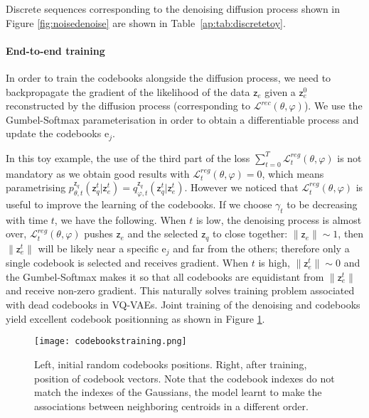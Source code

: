 \documentclass{article}
\theoremstyle{plain}
\theoremstyle{definition}
\theoremstyle{remark}
\newcommand{\latentcont}{\mathsf{z}_e}
\newcommand{\latentdis}{\mathsf{z}_q}
\newcommand{\rme}{\mathrm{e}}
\newcommand{\embed}{\rme}
\begin{document}
Discrete sequences corresponding to the denoising diffusion process shown in Figure \ref{fig:noisedenoise} are shown in Table~\ref{ap:tab:discretetoy}.

\paragraph{End-to-end training}
\label{ap:end2end}
In order to train the codebooks alongside the diffusion process, we need to backpropagate the gradient of the likelihood of the data $\latentcont$ given a $\latentcont^0$ reconstructed by the diffusion process (corresponding to $\mathcal{L}^{rec}(\theta,\varphi)$). We use the Gumbel-Softmax parameterisation in order to obtain a differentiable process and update the codebooks $\embed_j$.

In this toy example, the use of the third part of the loss $\sum_{t=0}^T \mathcal{L}^{reg}_t(\theta,\varphi)$ is not mandatory as we obtain good results with $\mathcal{L}^{reg}_t(\theta,\varphi) = 0$, which means parametrising $p_{\theta,t}^{\latentdis}(\latentdis^t|\latentcont^t) = q_{\varphi,t}^{\latentdis}(\latentdis^t|\latentcont^t)$. However we noticed that $\mathcal{L}^{reg}_t(\theta,\varphi)$ is useful to improve the learning of the codebooks. If we choose $\gamma_t$ to be decreasing with time $t$, we have the following. When $t$ is low, the denoising process is almost over, $\mathcal{L}^{reg}_t(\theta,\varphi)$ pushes $\latentcont$ and the selected $\latentdis$ to close together: $\|\latentcont\| \sim 1$, then $\|\latentcont^t\|$ will be likely near a specific $\embed_j$ and far from the others; therefore only a single codebook is selected and receives gradient. When $t$ is high, $\|\latentcont^t\| \sim 0$ and the Gumbel-Softmax makes it so that all codebooks are equidistant from $\|\latentcont^t\|$ and receive non-zero gradient. This naturally solves training problem associated with dead codebooks in VQ-VAEs. Joint training of the denoising and codebooks yield excellent codebook positionning as shown in Figure \ref{ap:codebooks}.

\begin{figure}[h!]
    \centering
    \texttt{[image: codebookstraining.png]}
    \caption{Left, initial random codebooks positions. Right, after training, position of codebook vectors. Note that the codebook indexes do not match the indexes of the Gaussians, the model learnt to make the associations between neighboring centroids in a different order.}
    \label{ap:codebooks}
\end{figure}
\end{document}
